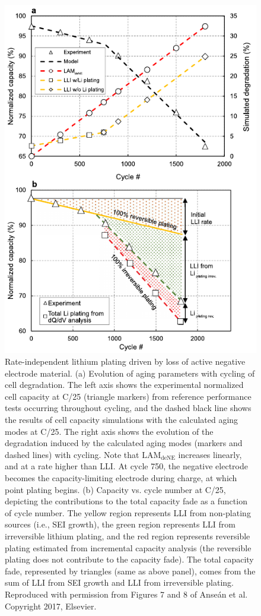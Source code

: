 \documentclass[journal=jpclcd,manuscript=article]{achemso}
\begin{document}
\begin{figure}[p]
    \centering
    \includegraphics[scale=1]{final_figures/thermo_plating_dubarry.pdf}
    \caption{Rate-independent lithium plating driven by loss of active negative electrode material. (a) Evolution of aging parameters with cycling of cell degradation. The left axis shows the experimental normalized cell capacity at C/25 (triangle markers) from reference performance tests occurring throughout cycling, and the dashed black line shows the results of cell capacity simulations with the calculated aging modes at C/25. The right axis shows the evolution of the degradation induced by the calculated aging modes (markers and dashed lines) with cycling. Note that $\mathrm{LAM_{deNE}}$ increases linearly, and at a rate higher than LLI. At cycle 750, the negative electrode becomes the capacity-limiting electrode during charge, at which point plating begins.
    (b) Capacity vs. cycle number at C/25, depicting the contributions to the total capacity fade as a function of cycle number. The yellow region represents LLI from non-plating sources (i.e., SEI growth), the green region represents LLI from irreversible lithium plating, and the red region represents reversible plating estimated from incremental capacity analysis (the reversible plating does not contribute to the capacity fade). The total capacity fade, represented by triangles (same as above panel), comes from the sum of LLI from SEI growth and LLI from irreversible plating.
    Reproduced with permission from Figures 7 and 8 of Anse\'an et al.\cite{ansean_operando_2017} Copyright 2017, Elsevier.} 
    \label{fig:thermo_plating}
\end{figure}
\end{document}
